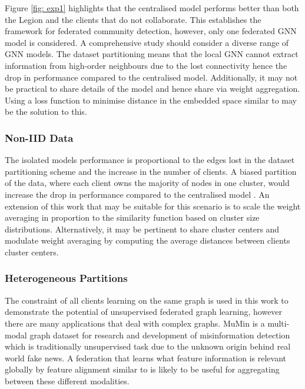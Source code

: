\documentclass[letterpaper]{article}
\begin{document}
Figure \ref{fig: exp1} highlights that the centralised model performs better than both the Legion and the clients that do not collaborate. This establishes the framework for federated community detection, however, only one federated GNN model is considered. A comprehensive study should consider a diverse range of GNN models. The dataset partitioning means that the local GNN cannot extract information from high-order neighbours due to the lost connectivity hence the drop in performance compared to the centralised model. Additionally, it may not be practical to share details of the model and hence share via weight aggregation. Using a loss function to minimise distance in the embedded space similar to \citet{makhija2022architecture} may be the solution to this.

\subsubsection*{\textbf{Non-IID Data}}

The isolated models performance is proportional to the edges lost in the dataset partitioning scheme and the increase in the number of clients. A biased partition of the data, where each client owns the majority of nodes in one cluster, would increase the drop in performance compared to the centralised model \cite{ma2022state}. An extension of this work that may be suitable for this scenario is to scale the weight averaging in proportion to the similarity function based on cluster size distributions. Alternatively, it may be pertinent to share cluster centers and modulate weight averaging by computing the average distances between clients cluster centers.


\subsubsection*{\textbf{Heterogeneous Partitions}}

The constraint of all clients learning on the same graph is used in this work to demonstrate the potential of unsupervised federated graph learning, however there are many applications that deal with complex graphs. MuMin \cite{nielsen2022mumin} is a multi-modal graph dataset for research and development of misinformation detection which is traditionally unsupervised task due to the unknown origin behind real world fake news. A federation that learns what feature information is relevant globally by feature alignment similar to \citet{zhuang2021towards} is likely to be useful for aggregating between these different modalities.
\end{document}
